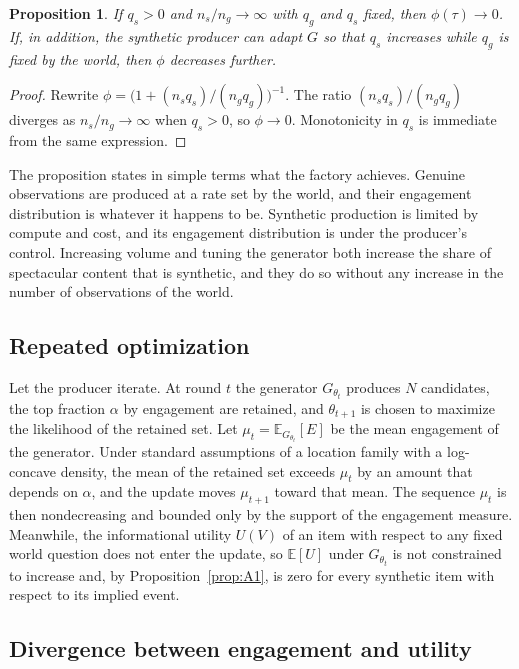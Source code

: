 \documentclass[12pt]{article}
\theoremstyle{plain}
\newtheorem{proposition}{Proposition}
\theoremstyle{definition}
\theoremstyle{remark}
\newcommand{\E}{\mathbb{E}}
\begin{document}
\begin{proposition}\label{prop:B1}
If $q_s > 0$ and $n_s / n_g \to \infty$ with $q_g$ and $q_s$ fixed, then $\phi(\tau) \to 0$. If, in addition, the synthetic producer can adapt $G$ so that $q_s$ increases while $q_g$ is fixed by the world, then $\phi$ decreases further.
\end{proposition}

\begin{proof}
Rewrite $\phi = \bigl(1 + (n_s q_s)/(n_g q_g)\bigr)^{-1}$. The ratio $(n_s q_s)/(n_g q_g)$ diverges as $n_s/n_g \to \infty$ when $q_s > 0$, so $\phi \to 0$. Monotonicity in $q_s$ is immediate from the same expression.
\end{proof}

The proposition states in simple terms what the factory achieves. Genuine observations are produced at a rate set by the world, and their engagement distribution is whatever it happens to be. Synthetic production is limited by compute and cost, and its engagement distribution is under the producer's control. Increasing volume and tuning the generator both increase the share of spectacular content that is synthetic, and they do so without any increase in the number of observations of the world.

\subsection*{Repeated optimization}

Let the producer iterate. At round $t$ the generator $G_{\theta_t}$ produces $N$ candidates, the top fraction $\alpha$ by engagement are retained, and $\theta_{t+1}$ is chosen to maximize the likelihood of the retained set. Let $\mu_t = \E_{G_{\theta_t}}[E]$ be the mean engagement of the generator. Under standard assumptions of a location family with a log-concave density, the mean of the retained set exceeds $\mu_t$ by an amount that depends on $\alpha$, and the update moves $\mu_{t+1}$ toward that mean. The sequence $\mu_t$ is then nondecreasing and bounded only by the support of the engagement measure. Meanwhile, the informational utility $U(V)$ of an item with respect to any fixed world question does not enter the update, so $\E[U]$ under $G_{\theta_t}$ is not constrained to increase and, by Proposition~\ref{prop:A1}, is zero for every synthetic item with respect to its implied event.

\subsection*{Divergence between engagement and utility}
\end{document}
